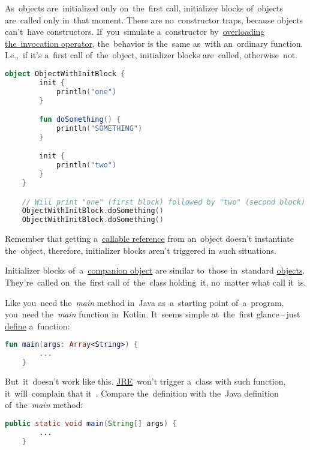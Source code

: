 \label{objectinitblock}
As~objects are~initialized only on~the~first call, initializer blocks of~objects are~called only in~that moment.
There are no~constructor traps, because objects can't~have constructors.
If~you~simulate a~constructor by~\hyperref[kotlinoperatoroverload]{overloading the~invocation operator}, the~behavior is the~same as~with an~ordinary function.
I.e.,~if it's a~first call of~the~object, initializer blocks are~called, otherwise~not.

\begin{lstlisting}[language=Kotlin]
    object ObjectWithInitBlock {
        init {
            println("one")
        }

        fun doSomething() {
            println("SOMETHING")
        }

        init {
            println("two")
        }
    }

    // Will print "one" (first block) followed by "two" (second block) followed by "SOMETHING" twice (two calls of the function)
    ObjectWithInitBlock.doSomething()
    ObjectWithInitBlock.doSomething()
\end{lstlisting}

\warning Remember that getting a~\hyperref[kotlincallablereference]{callable reference} from an~object doesn't instantiate the~object, therefore, initializer blocks aren't triggered in~such situations.

Initializer blocks of~a~\hyperref[companionobject]{companion object} are similar to~those in~standard \hyperref[kotlinobject]{objects}.
They're~called on~the~first call of~the~class holding~it, no~matter what call it~is.

Like you~need the~\textit{main} method in~Java as~a~starting point of~a~program, you~need the~\textit{main} function in~Kotlin.
It~seems simple at~the~first glance\,--\,just \hyperref[declarationdefinition]{define} a~function:
\begin{lstlisting}[frame=no, language=Kotlin]
    fun main(args: Array<String>) {
        ...
    }
\end{lstlisting}

\noindent But~it~doesn't work like this.
\hyperref[jdkjrejvm]{JRE}~won't trigger a~class with such function, it~will~complain that it~.
Compare the~definition with the~Java definition of~the~\textit{main} method:
\begin{lstlisting}[frame=no, language=Java]
    public static void main(String[] args) {
        ...
    }
\end{lstlisting}

